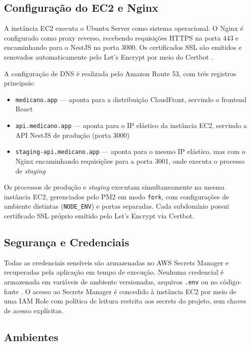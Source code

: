 \subsection{Configuração do EC2 e Nginx}
\label{subsec:ec2-nginx}

A instância EC2 executa o Ubuntu Server como
sistema operacional. O Nginx é configurado como
proxy reverso, recebendo requisições HTTPS na
porta 443 e encaminhando para o NestJS na porta
3000. Os certificados SSL são emitidos e renovados
automaticamente pelo Let's Encrypt por meio do
Certbot \cite{reese2008}.

A configuração de DNS é realizada pelo Amazon Route 53,
com três registros principais:

\begin{itemize}
  \item \texttt{medicano.app} --- aponta para a distribuição
        CloudFront, servindo o frontend React
  \item \texttt{api.medicano.app} --- aponta para o IP elástico
        da instância EC2, servindo a API NestJS de produção
        (porta 3000)
  \item \texttt{staging-api.medicano.app} --- aponta para o
        mesmo IP elástico, mas com o Nginx encaminhando
        requisições para a porta 3001, onde executa o
        processo de \textit{staging}
\end{itemize}

Os processos de produção e \textit{staging} executam
simultaneamente na mesma instância EC2, gerenciados pelo
PM2 em modo \texttt{fork}, com configurações de ambiente
distintas (\texttt{NODE\_ENV}) e portas separadas.
Cada subdomínio possui certificado SSL próprio emitido
pelo Let's Encrypt via Certbot.

\subsection{Segurança e Credenciais}
\label{subsec:security}

Todas as credenciais sensíveis são armazenadas no
AWS Secrets Manager e recuperadas pela aplicação
em tempo de execução. Nenhuma credencial é
armazenada em variáveis de ambiente versionadas,
arquivos \texttt{.env} ou no código-fonte
\cite{awssm}. O acesso ao Secrets Manager é
concedido à instância EC2 por meio de uma IAM
Role com política de leitura restrita aos secrets
do projeto, sem chaves de acesso explícitas.

\subsection{Ambientes}
\label{subsec:environments}

